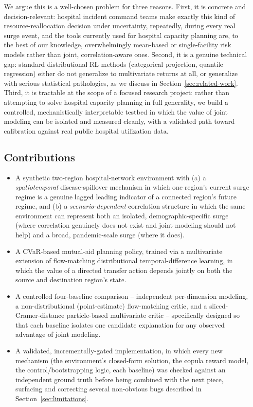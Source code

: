 \documentclass[11pt]{article}
\begin{document}
We argue this is a well-chosen problem for three reasons. First, it is concrete and decision-relevant: hospital incident command teams make exactly this kind of resource-reallocation decision under uncertainty, repeatedly, during every real surge event, and the tools currently used for hospital capacity planning are, to the best of our knowledge, overwhelmingly mean-based or single-facility risk models rather than joint, correlation-aware ones. Second, it is a genuine technical gap: standard distributional RL methods (categorical projection, quantile regression) either do not generalize to multivariate returns at all, or generalize with serious statistical pathologies, as we discuss in Section~\ref{sec:related-work}. Third, it is tractable at the scope of a focused research project: rather than attempting to solve hospital capacity planning in full generality, we build a controlled, mechanistically interpretable testbed in which the value of joint modeling can be isolated and measured cleanly, with a validated path toward calibration against real public hospital utilization data.

\subsection{Contributions}
\begin{itemize}[leftmargin=*]
\item A synthetic two-region hospital-network environment with (a) a \emph{spatiotemporal} disease-spillover mechanism in which one region's current surge regime is a genuine lagged leading indicator of a connected region's future regime, and (b) a \emph{scenario-dependent} correlation structure in which the same environment can represent both an isolated, demographic-specific surge (where correlation genuinely does not exist and joint modeling should not help) and a broad, pandemic-scale surge (where it does).
\item A CVaR-based mutual-aid planning policy, trained via a multivariate extension of flow-matching distributional temporal-difference learning, in which the value of a directed transfer action depends jointly on both the source and destination region's state.
\item A controlled four-baseline comparison -- independent per-dimension modeling, a non-distributional (point-estimate) flow-matching critic, and a sliced-Cramer-distance particle-based multivariate critic -- specifically designed so that each baseline isolates one candidate explanation for any observed advantage of joint modeling.
\item A validated, incrementally-gated implementation, in which every new mechanism (the environment's closed-form solution, the copula reward model, the control/bootstrapping logic, each baseline) was checked against an independent ground truth before being combined with the next piece, surfacing and correcting several non-obvious bugs described in Section~\ref{sec:limitations}.
\end{itemize}
\end{document}
